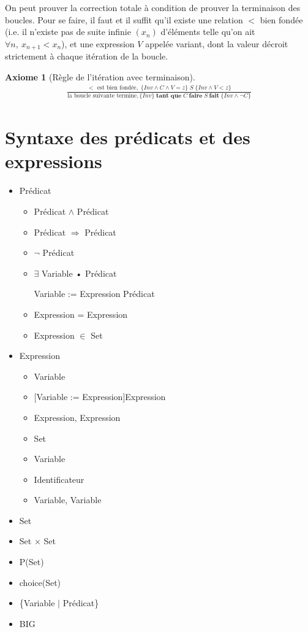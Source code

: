 \documentclass[10pt,a4paper]{article}
\newtheorem{axiom}{Axiome}[section]
\begin{document}
{On peut prouver la correction totale à condition de prouver la terminaison des boucles.
Pour se faire, il faut et il suffit qu'il existe une relation $<$ bien fondée (i.e. il n'existe pas de suite infinie $(x_n)$ d'éléments telle qu'on ait $\forall n, \ x_{n+1} < x_n$), et une expression $V$ appelée variant, dont la valeur décroit strictement à chaque itération de la boucle.

\begin{axiom}[Règle de l'itération avec terminaison]
\begin{align}
\frac{< \textrm{\ est\ bien fondée},\;\{Inv \land C \land V=z \}\;S\;\{Inv \land V < z\}} {\textrm{la boucle suivante termine}, \{Inv\}\;\textbf{tant que}\;C\; \textbf{faire}\; S \ \textbf{fait} \;\{Inv \land \lnot C \} }
\end{align}
\end{axiom}

\section{Syntaxe des prédicats et des expressions}
\label{SyntaxPredicatExpression}
\begin{itemize}
\item Prédicat
\begin{itemize}
\item Prédicat $\wedge$ Prédicat
\item Prédicat $\Rightarrow$ Prédicat
\item $\lnot$ Prédicat
\item $\exists$ Variable • Prédicat
\item [Variable := Expression] Prédicat
\item Expression = Expression
\item Expression $\in$ Set
\end{itemize}
\item Expression
\begin{itemize}
\item Variable
\item $[$Variable := Expression$]$Expression
\item Expression, Expression
\item Set
\item Variable
\item Identificateur
\item Variable, Variable
\end{itemize}
\item Set
\item Set $\times$ Set
\item P(Set)
\item choice(Set)
\item \{Variable $|$ Prédicat\}
\item BIG


\end{itemize}}
\end{document}
